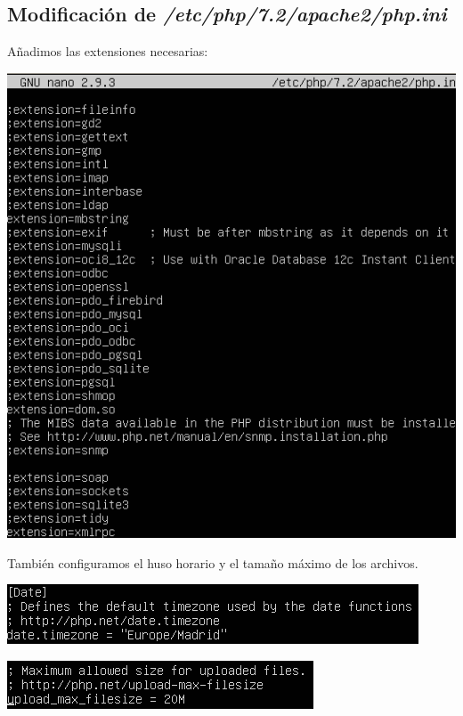\documentclass{article}
\begin{document}
\subsection{Modificación de \textit{/etc/php/7.2/apache2/php.ini}}

Añadimos las extensiones necesarias:

\begin{center}
\includegraphics[scale=0.6]{images/extensiones.png}
\end{center}

También configuramos el huso horario y el tamaño máximo de los archivos.

\begin{center}
\includegraphics[scale=0.6]{images/timezone.png}
\end{center}

\begin{center}
\includegraphics[scale=0.6]{images/filesize.png}
\end{center}
\end{document}
